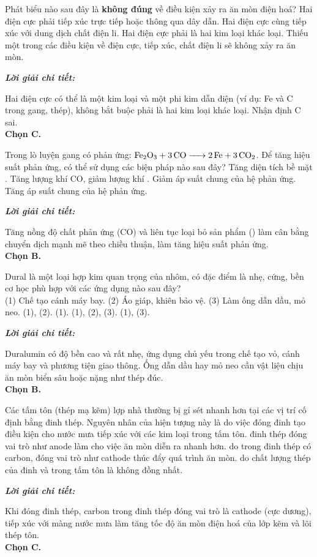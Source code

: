 \documentclass[11pt,a4paper]{article}
\def\loigiai#1{
\par\begingroup\color{blue!80!black}\small
\noindent\textbf{\textit{Lời giải chi tiết:}}\par
#1\par\endgroup}
\begin{document}
\begin{ex}
Phát biểu nào sau đây là \textbf{không đúng} về điều kiện xảy ra ăn mòn điện hoá?
\choice
{Hai điện cực phải tiếp xúc trực tiếp hoặc thông qua dây dẫn.}
{Hai điện cực cùng tiếp xúc với dung dịch chất điện li.}
{\True Hai điện cực phải là hai kim loại khác loại.}
{Thiếu một trong các điều kiện về điện cực, tiếp xúc, chất điện li sẽ không xảy ra ăn mòn.}
\loigiai{
Hai điện cực có thể là một kim loại và một phi kim dẫn điện (ví dụ: Fe và C trong gang, thép), không bắt buộc phải là hai kim loại khác loại. Nhận định C sai.\\
\textbf{Chọn C.}}
\end{ex}

\begin{ex}
Trong lò luyện gang có phản ứng: $\ce{Fe2O3 + 3CO -> 2Fe + 3CO2}$. Để tăng hiệu suất phản ứng, có thể sử dụng các biện pháp nào sau đây?
\choice
{Tăng diện tích bề mặt .}
{\True Tăng lượng khí CO, giảm lượng khí .}
{Giảm áp suất chung của hệ phản ứng.}
{Tăng áp suất chung của hệ phản ứng.}
\loigiai{
Tăng nồng độ chất phản ứng (CO) và liên tục loại bỏ sản phẩm (\ce{CO2}) làm cân bằng chuyển dịch mạnh mẽ theo chiều thuận, làm tăng hiệu suất phản ứng.\\
\textbf{Chọn B.}}
\end{ex}

\begin{ex}
Dural là một loại hợp kim quan trọng của nhôm, có đặc điểm là nhẹ, cứng, bền cơ học phù hợp với các ứng dụng nào sau đây?\\
(1) Chế tạo cánh máy bay. \quad (2) Áo giáp, khiên bảo vệ. \quad (3) Làm ống dẫn dầu, mỏ neo.
\choice
{(1), (2).}
{\True (1).}
{(1), (2), (3).}
{(1), (3).}
\loigiai{
Duralumin có độ bền cao và rất nhẹ, ứng dụng chủ yếu trong chế tạo vỏ, cánh máy bay và phương tiện giao thông. Ống dẫn dầu hay mỏ neo cần vật liệu chịu ăn mòn biển sâu hoặc nặng như thép đúc.\\
\textbf{Chọn B.}}
\end{ex}

\begin{ex}
Các tấm tôn (thép mạ kẽm) lợp nhà thường bị gỉ sét nhanh hơn tại các vị trí cố định bằng đinh thép. Nguyên nhân của hiện tượng này là do
\choice
{việc đóng đinh tạo điều kiện cho nước mưa tiếp xúc với các kim loại trong tấm tôn.}
{đinh thép đóng vai trò như anode làm cho việc ăn mòn diễn ra nhanh hơn.}
{\True do trong đinh thép có carbon, đóng vai trò như cathode thúc đẩy quá trình ăn mòn.}
{do chất lượng thép của đinh và trong tấm tôn là không đồng nhất.}
\loigiai{
Khi đóng đinh thép, carbon trong đinh thép đóng vai trò là cathode (cực dương), tiếp xúc với màng nước mưa làm tăng tốc độ ăn mòn điện hoá của lớp kẽm và lõi thép tôn.\\
\textbf{Chọn C.}}
\end{ex}
\end{document}
